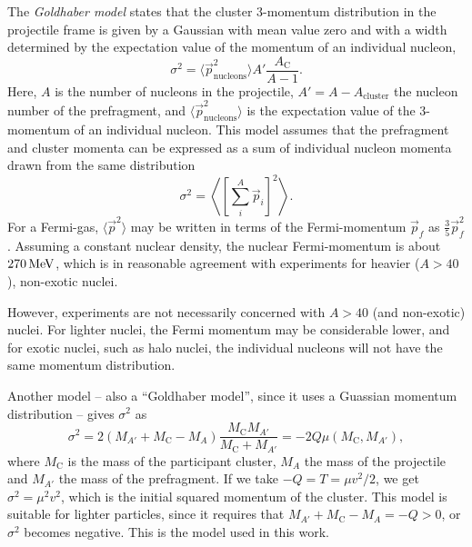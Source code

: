 The \emph{Goldhaber model} states that the cluster 3-momentum distribution in the projectile frame is given by a Gaussian with mean value zero and with a width determined by the expectation value of the momentum of an individual nucleon,
\begin{equation}
\sigma^2 = \langle \vec{p}_\text{nucleons}^2 \rangle A'\frac{A_\text{C}}{A-1}.
\end{equation}
Here, $A$ is the number of nucleons in the projectile, $A' = A-A_\text{cluster}$ the nucleon number of the prefragment, and $\langle \vec{p}_\text{nucleons}^2 \rangle$ is the expectation value of the 3-momentum of an individual nucleon. This model assumes that the prefragment and cluster momenta can be expressed as a sum of individual nucleon momenta drawn from the same distribution
\begin{equation}
\sigma^2 = \left\langle \left[\sum_i^A \vec{p}_i\right]^2 \right\rangle.
\end{equation}
For a Fermi-gas, $\langle \vec{p}^2 \rangle$ may be written in terms of the Fermi-momentum $\vec{p}_f$ as $\tfrac{3}{5} \vec{p}_f^2$\cite{goldhaber:1974:art}.
Assuming a constant nuclear density, the nuclear Fermi-momentum is about $\unit[270]{MeV}$, which is in reasonable agreement with experiments for heavier ($A>40$), non-exotic nuclei\cite{moniz:1971}. 

However, \rtb{} experiments are not necessarily concerned with $A>40$ (and non-exotic) nuclei. For lighter nuclei, the Fermi momentum may be considerable lower\cite{bartke2009introduction}, and for exotic nuclei, such as halo nuclei, the individual nucleons will not have the same momentum distribution.

Another model -- also a ``Goldhaber model'', since it uses a Guassian momentum distribution -- gives $\sigma^2$ as
\begin{equation}
\sigma^2 = 2 (M_{A'} + M_\text{C} -M_A) \frac{M_\text{C}M_{A'}}{M_\text{C}+M_{A'}} = -2 Q \mu(M_\text{C},M_{A'}),
\end{equation}
where $M_\text{C}$ is the mass of the participant cluster, $M_A$ the mass of the projectile and $M_{A'}$ the mass of the prefragment. If we take $-Q=T = \mu v^2/2$, we get $\sigma^2 = \mu^2 v^2$, which is the initial squared momentum of the cluster. This model is suitable for lighter particles, since it requires that $M_{A'} + M_\text{C} -M_A = -Q >0$, or $\sigma^2$ becomes negative. This is the model used in this work.

